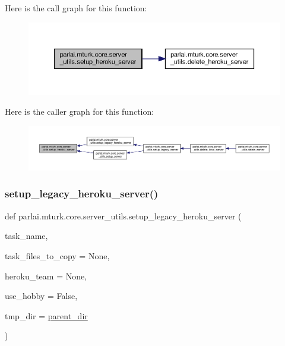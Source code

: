 Here is the call graph for this function\+:
\nopagebreak
\begin{figure}[H]
\begin{center}
\leavevmode
\includegraphics[width=350pt]{namespaceparlai_1_1mturk_1_1core_1_1server__utils_af1c97e9b93a403e200ac75b87a51c3c1_cgraph}
\end{center}
\end{figure}
Here is the caller graph for this function\+:
\nopagebreak
\begin{figure}[H]
\begin{center}
\leavevmode
\includegraphics[width=350pt]{namespaceparlai_1_1mturk_1_1core_1_1server__utils_af1c97e9b93a403e200ac75b87a51c3c1_icgraph}
\end{center}
\end{figure}
\mbox{\label{namespaceparlai_1_1mturk_1_1core_1_1server__utils_adff2f564896069e0b76ae1b007515a2b}} 
\subsubsection{\texorpdfstring{setup\+\_\+legacy\+\_\+heroku\+\_\+server()}{setup\_legacy\_heroku\_server()}}
{\footnotesize\ttfamily def parlai.\+mturk.\+core.\+server\+\_\+utils.\+setup\+\_\+legacy\+\_\+heroku\+\_\+server (\begin{DoxyParamCaption}\item[{}]{task\+\_\+name,  }\item[{}]{task\+\_\+files\+\_\+to\+\_\+copy = {\ttfamily None},  }\item[{}]{heroku\+\_\+team = {\ttfamily None},  }\item[{}]{use\+\_\+hobby = {\ttfamily False},  }\item[{}]{tmp\+\_\+dir = {\ttfamily \hyperlink{namespaceparlai_1_1mturk_1_1core_1_1server__utils_a193439bdbc25a32b00f1a43e6f8532d8}{parent\+\_\+dir}} }\end{DoxyParamCaption})}



